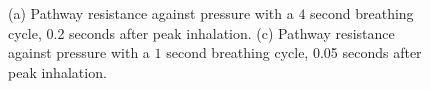\begin{figure}[H]
  \centering
\caption{(a) Pathway resistance against pressure with a $4$ second breathing cycle, 0.2 seconds after peak inhalation. (c) Pathway resistance against pressure with a $1$ second breathing cycle, 0.05 seconds after peak inhalation.}
 \end{figure}






%
%


